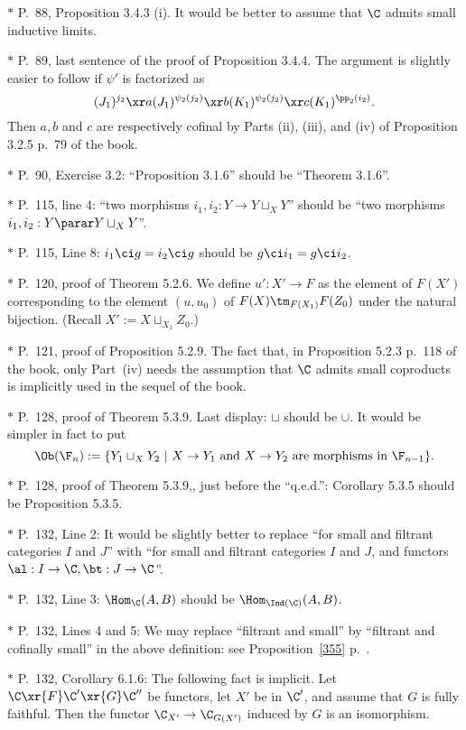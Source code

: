 \documentclass[12pt]{article}
\theoremstyle{remark}
\theoremstyle{definition}
\begin{document}
\nn$*$ P.~88, Proposition 3.4.3 (i). It would be better to assume that $\C$ admits small inductive limits.

\nn$*$ P.~89, last sentence of the proof of Proposition 3.4.4. The argument is slightly easier to follow if $\psi'$ is factorized as 
$$
(J_1)^{j_2}\xr a(J_1)^{\psi_2(j_2)}\xr b(K_1)^{\psi_2(j_2)}\xr c(K_1)^{\pp_2(i_2)}.
$$ 
Then $a,b$ and $c$ are respectively cofinal by Parts (ii), (iii), and (iv) of Proposition 3.2.5 p.~79 of the book.

\nn$*$ P.~90, Exercise 3.2: ``Proposition 3.1.6'' should be ``Theorem 3.1.6''.

\nn$*$ P.~115, line 4: ``two morphisms $i_1,i_2:Y\to Y\sqcup_XY$'' should be ``two morphisms $i_1,i_2:Y\parar Y\sqcup_XY$''. 

\nn$*$ P.~115, Line 8: $i_1\ci g=i_2\ci g$ should be $g\ci i_1=g\ci i_2$.

\nn$*$ P.~120, proof of Theorem 5.2.6. We define $u':X'\to F$ as the element of $F(X')$ corresponding to the element $(u,u_0)$ of $F(X)\tm_{F(X_1)}F(Z_0)$ under the natural bijection. (Recall $X':=X\sqcup_{X_1}Z_0$.)

\nn$*$ P.~121, proof of Proposition 5.2.9. The fact that, in Proposition 5.2.3 p.~118 of the book, only Part~(iv) needs the assumption that $\C$ admits small coproducts is implicitly used in the sequel of the book.

\nn$*$ P.~128, proof of Theorem 5.3.9. Last display: $\sqcup$ should be $\cup$. It would be simpler in fact to put 
$$
\Ob(\F_n):=\{Y_1\sqcup_XY_2\ |\ X\to Y_1\text{ and }X\to Y_2\text{ are morphisms in }\F_{n-1}\}.
$$ 

\nn$*$ P.~128, proof of Theorem 5.3.9,, just before the ``q.e.d.'': Corollary 5.3.5 should be Proposition 5.3.5.

\nn$*$ P.~132, Line 2: It would be slightly better to replace ``for small and filtrant categories $I$ and $J$'' with ``for small and filtrant categories $I$ and $J$, and functors $\al:I\to\C,\bt:J\to\C$''.

\nn$*$ P.~132, Line 3: $\Hom_\C(A,B)$ should be $\Hom_{\Ind(\C)}(A,B)$.

\nn$*$ P.~132, Lines 4 and 5: \guillemotleft We may replace ``filtrant and small'' by ``filtrant and cofinally small'' in the above definition\guillemotright: see Proposition~\ref{355} p.~.

\nn$*$ P.~132, Corollary 6.1.6: The following fact is implicit. Let $\C\xr{F}\C'\xr{G}\C''$ be functors, let $X'$ be in $\C'$, and assume that $G$ is fully faithful. Then the functor $\C_{X'}\to\C_{G(X')}$ induced by $G$ is an isomorphism.
\end{document}
